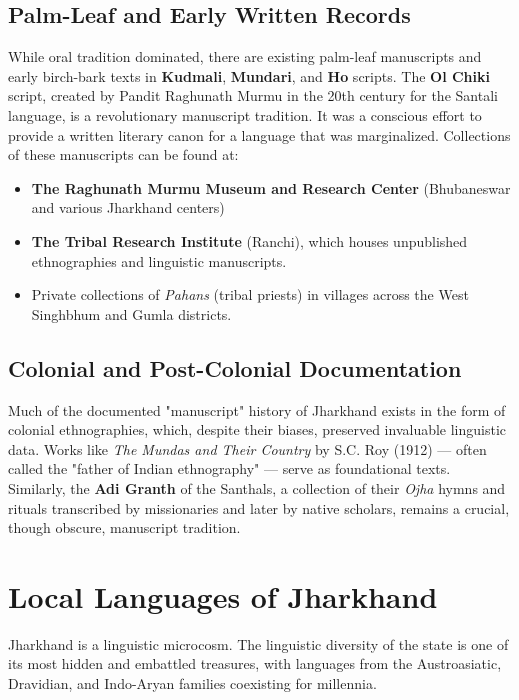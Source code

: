 \documentclass{article}
\begin{document}
\subsection{Palm-Leaf and Early Written Records}
While oral tradition dominated, there are existing palm-leaf manuscripts and early birch-bark texts in \textbf{Kudmali}, \textbf{Mundari}, and \textbf{Ho} scripts. The \textbf{Ol Chiki} script, created by Pandit Raghunath Murmu in the 20th century for the Santali language, is a revolutionary manuscript tradition. It was a conscious effort to provide a written literary canon for a language that was marginalized. Collections of these manuscripts can be found at:
\begin{itemize}
    \item \textbf{The Raghunath Murmu Museum and Research Center} (Bhubaneswar and various Jharkhand centers)
    \item \textbf{The Tribal Research Institute} (Ranchi), which houses unpublished ethnographies and linguistic manuscripts.
    \item Private collections of \textit{Pahans} (tribal priests) in villages across the West Singhbhum and Gumla districts.
\end{itemize}

\subsection{Colonial and Post-Colonial Documentation}
Much of the documented "manuscript" history of Jharkhand exists in the form of colonial ethnographies, which, despite their biases, preserved invaluable linguistic data. Works like \textit{The Mundas and Their Country} by S.C. Roy (1912) — often called the "father of Indian ethnography" — serve as foundational texts. Similarly, the \textbf{Adi Granth} of the Santhals, a collection of their \textit{Ojha} hymns and rituals transcribed by missionaries and later by native scholars, remains a crucial, though obscure, manuscript tradition.

\newpage

\section{Local Languages of Jharkhand}
Jharkhand is a linguistic microcosm. The linguistic diversity of the state is one of its most hidden and embattled treasures, with languages from the Austroasiatic, Dravidian, and Indo-Aryan families coexisting for millennia.
\end{document}
